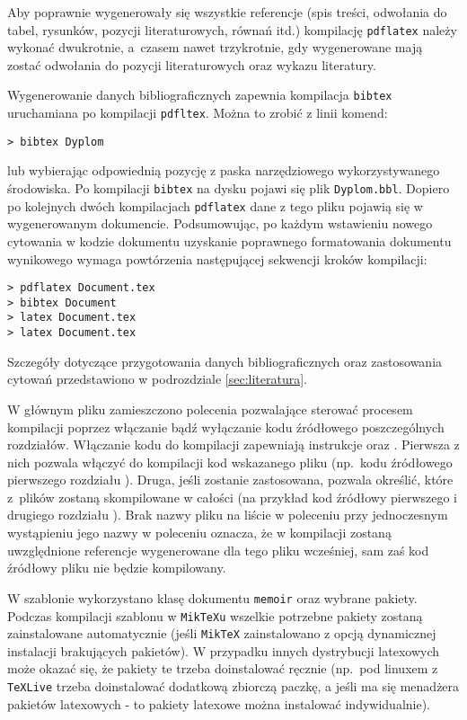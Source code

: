 Aby poprawnie wygenerowały się wszystkie referencje (spis treści, odwołania do tabel, rysunków, pozycji literaturowych, równań itd.) kompilację \texttt{pdflatex} należy wykonać dwukrotnie, a~czasem nawet trzykrotnie, gdy wygenerowane mają zostać odwołania do pozycji literaturowych oraz wykazu literatury. 

Wygenerowanie danych bibliograficznych zapewnia kompilacja \texttt{bibtex} uruchamiana po kompilacji \texttt{pdfltex}. Można to zrobić z linii komend:
\begin{lstlisting}[basicstyle=\ttfamily]
> bibtex Dyplom
\end{lstlisting}
lub wybierając odpowiednią pozycję z paska narzędziowego wykorzystywanego środowiska. Po kompilacji \texttt{bibtex} na dysku pojawi się plik \texttt{Dyplom.bbl}. Dopiero po kolejnych dwóch kompilacjach \texttt{pdflatex} dane z tego pliku pojawią się w wygenerowanym dokumencie. Podsumowując, po każdym wstawieniu nowego cytowania w kodzie dokumentu uzyskanie poprawnego formatowania dokumentu wynikowego wymaga powtórzenia następującej sekwencji kroków kompilacji:
\begin{lstlisting}[basicstyle=\ttfamily]
> pdflatex Document.tex
> bibtex Document
> latex Document.tex
> latex Document.tex
\end{lstlisting}
Szczegóły dotyczące przygotowania danych bibliograficznych oraz zastosowania cytowań przedstawiono w podrozdziale \ref{sec:literatura}.

W głównym pliku zamieszczono polecenia pozwalające sterować procesem kompilacji poprzez włączanie bądź wyłączanie kodu źródłowego poszczególnych rozdziałów. Włączanie kodu do kompilacji zapewniają instrukcje \verb++ oraz \verb++. Pierwsza z nich pozwala włączyć do kompilacji kod wskazanego pliku (np.\ kodu źródłowego pierwszego rozdziału \verb++). Druga, jeśli zostanie zastosowana, pozwala określić, które z~plików zostaną skompilowane w całości (na przykład kod źródłowy pierwszego i drugiego rozdziału \verb++).
Brak nazwy pliku na liście w poleceniu \verb++ przy jednoczesnym wystąpieniu jego nazwy w poleceniu \verb++ oznacza, że w kompilacji zostaną uwzględnione referencje wygenerowane dla tego pliku wcześniej, sam zaś kod źródłowy pliku nie będzie kompilowany. 

W szablonie wykorzystano klasę dokumentu \texttt{memoir} oraz wybrane pakiety. Podczas kompilacji szablonu w \texttt{MikTeXu} wszelkie potrzebne pakiety zostaną zainstalowane automatycznie (jeśli \texttt{MikTeX} zainstalowano z opcją dynamicznej instalacji brakujących pakietów). W przypadku innych dystrybucji latexowych może okazać się, że pakiety te trzeba doinstalować ręcznie (np.\ pod linuxem z \texttt{TeXLive} trzeba doinstalować dodatkową zbiorczą paczkę, a jeśli ma się menadżera pakietów latexowych - to pakiety latexowe można instalować indywidualnie).

